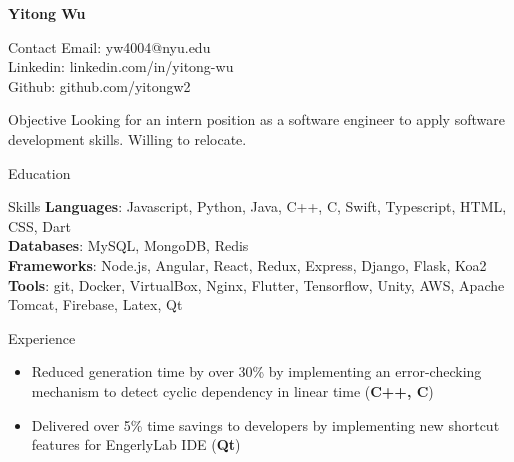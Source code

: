 \documentclass{resume}
\begin{document}
\begin{flushleft}
{\LARGE \textbf{Yitong Wu}} \\
\end{flushleft}

\begin{section}{Contact}
Email: yw4004@nyu.edu \\
Linkedin: linkedin.com/in/yitong-wu \\
Github: github.com/yitongw2
\end{section}

\begin{section}{Objective}
Looking for an intern position as a software engineer to apply software development skills. Willing to relocate.
\end{section}

\begin{section}{Education}
\vspace{0.15cm}
\end{section}

\begin{section}{Skills}
\textbf{Languages}: Javascript, Python, Java, C++, C, Swift, Typescript, HTML, CSS, Dart \\
\textbf{Databases}: MySQL, MongoDB, Redis \\
\textbf{Frameworks}: Node.js, Angular, React, Redux, Express, Django, Flask, Koa2 \\
\textbf{Tools}: git, Docker, VirtualBox, Nginx, Flutter, Tensorflow, Unity, AWS, Apache Tomcat, Firebase, Latex, Qt
\end{section}

\begin{section}{Experience}
\vspace{0cm}
\begin{itemize}[topsep=0pt, itemsep=0pt, partopsep=0pt, parsep=0pt]
    \setlength\itemsep{0cm}
    \item Reduced generation time by over 30\% by implementing an error-checking mechanism to detect cyclic dependency in linear time (\textbf{C++, C})
    \item Delivered over 5\% time savings to developers by implementing new shortcut features for EngerlyLab IDE (\textbf{Qt})
\end{itemize}
\end{section}
\end{document}
